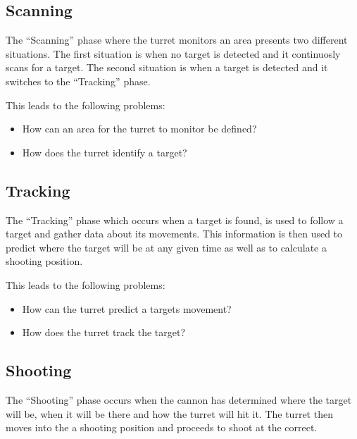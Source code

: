 \subsection{Scanning}
The ``Scanning'' phase where the turret monitors an area presents two different
situations. The first situation is when no target is detected and it continuosly
scans for a target. The second situation is when a target is detected and it
switches to the ``Tracking'' phase.\nl

This leads to the following problems:
\begin{itemize}
  \item How can an area for the turret to monitor be defined?
  \item How does the turret identify a target?
\end{itemize}

% 
% 

\subsection{Tracking}
The ``Tracking'' phase which occurs when a target is found, is used to follow a
target and gather data about its movements. This information is then used to
predict where the target will be at any given time as well as to calculate a
shooting position.\nl

This leads to the following problems:
\begin{itemize}
  \item How can the turret predict a targets movement?
  \item How does the turret track the target?
\end{itemize}

\subsection{Shooting}
The ``Shooting'' phase occurs when the cannon has determined where the target
will be, when it will be there and how the turret will hit it. The turret then moves
into the a shooting position and proceeds to shoot at the correct.\nl

